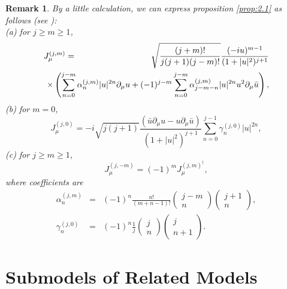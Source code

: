 \documentclass[makeidx,12pt,openany]{report}
\newtheorem{rmk}[df]{Remark}
\begin{document}
\begin{rmk}By a little calculation, we can express proposition 
\ref{prop:2.1} as follows (see \cite{FS1}): \\
(a) for $j \geq m \geq 1$, 
 \begin{eqnarray}
   J_{\mu}^{(j,m)} &=&
    \sqrt{\frac{(j+m)!}{j(j+1)(j-m)!}}
    \frac{(-iu)^{m-1}}{(1+|u|^2)^{j+1}} \nonumber\\
  && \hspace{-15mm} \times
   \left(  
    \sum_{n=0}^{j-m} \alpha _n^{(j,m)} |u|^{2n} \partial_{\mu} u + (-1)^{j-m}
    \sum_{n=0}^{j-m} \alpha _{j-m-n}^{(j,m)} |u|^{2n} u^2 \partial_{\mu}\bar{u}
   \right) ,
 \end{eqnarray}
(b) for $m=0$, 
 \begin{equation}
   J_{\mu}^{(j,0)}=
    -i \sqrt{j(j+1)}
    \frac{(\bar{u} \partial_{\mu} u - u \partial_{\mu} \bar{u})}
         {(1+|u|^2)^{j+1}} 
    \sum_{n=0}^{j-1} \gamma_n^{(j,0)} |u|^{2n} , 
 \end{equation}
(c) for $j \geq m \geq 1$, 
\begin{equation}
  J_{\mu}^{(j,-m)}=(-1)^m  J_{\mu}^{(j,m)^{\dag}}, 
\end{equation}
where coefficients are
\begin{eqnarray}
 \alpha _n^{(j,m)} &=&
   (-1)^n
   \frac{n!}{(m+n-1)!} 
    \left(
     \begin{array}{c}
      j-m \\
       n  
     \end{array}
    \right)
    \left(
     \begin{array}{c}
       j+1 \\
        n  
     \end{array}
    \right) , \\
   \gamma_n^{(j,0)} &=&
   (-1)^n
   \frac{1}{j} 
    \left(
     \begin{array}{c}
       j \\
       n  
     \end{array}
    \right)
    \left(
     \begin{array}{c}
        j \\
       n+1  
     \end{array}
    \right) .
\end{eqnarray}
\end{rmk}
\chapter{Submodels of Related Models}
\end{document}
